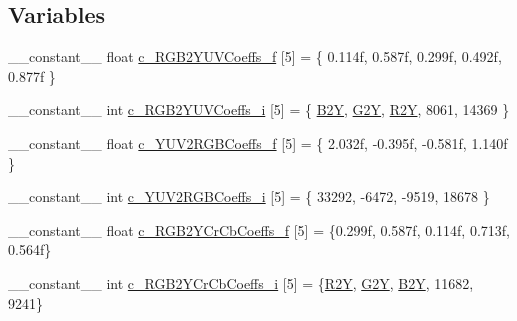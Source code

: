 \subsection*{Variables}
\begin{DoxyCompactItemize}
\item 
\-\_\-\-\_\-constant\-\_\-\-\_\- float \hyperlink{namespacecv_1_1gpu_1_1device_1_1color__detail_a7ba0f4d26dc8d4cdf0ea7045eea9a7f6}{c\-\_\-\-R\-G\-B2\-Y\-U\-V\-Coeffs\-\_\-f} \mbox{[}5\mbox{]} = \{ 0.\-114f, 0.\-587f, 0.\-299f, 0.\-492f, 0.\-877f \}
\item 
\-\_\-\-\_\-constant\-\_\-\-\_\- int \hyperlink{namespacecv_1_1gpu_1_1device_1_1color__detail_a706522af96fd781d4288448f001d3c6a}{c\-\_\-\-R\-G\-B2\-Y\-U\-V\-Coeffs\-\_\-i} \mbox{[}5\mbox{]} = \{ \hyperlink{namespacecv_1_1gpu_1_1device_1_1color__detail_ae58c078ca311bfd585ee671e5be8ae7ea012d3fbd135db816dc4aa715157d30e9}{B2\-Y}, \hyperlink{namespacecv_1_1gpu_1_1device_1_1color__detail_ae58c078ca311bfd585ee671e5be8ae7eaa29ed213682a1a97cc5fcc96decf0ad7}{G2\-Y}, \hyperlink{namespacecv_1_1gpu_1_1device_1_1color__detail_ae58c078ca311bfd585ee671e5be8ae7ead9cfd5ce6f8a65d50a1009d31ec5b27f}{R2\-Y}, 8061, 14369 \}
\item 
\-\_\-\-\_\-constant\-\_\-\-\_\- float \hyperlink{namespacecv_1_1gpu_1_1device_1_1color__detail_aaf1f69ee36d3549b97afb7bbd3cd4346}{c\-\_\-\-Y\-U\-V2\-R\-G\-B\-Coeffs\-\_\-f} \mbox{[}5\mbox{]} = \{ 2.\-032f, -\/0.\-395f, -\/0.\-581f, 1.\-140f \}
\item 
\-\_\-\-\_\-constant\-\_\-\-\_\- int \hyperlink{namespacecv_1_1gpu_1_1device_1_1color__detail_a6fc1bc14a4a8c737b6aeca6da9bf8497}{c\-\_\-\-Y\-U\-V2\-R\-G\-B\-Coeffs\-\_\-i} \mbox{[}5\mbox{]} = \{ 33292, -\/6472, -\/9519, 18678 \}
\item 
\-\_\-\-\_\-constant\-\_\-\-\_\- float \hyperlink{namespacecv_1_1gpu_1_1device_1_1color__detail_adaa4dd39f9935092666b86359548bd36}{c\-\_\-\-R\-G\-B2\-Y\-Cr\-Cb\-Coeffs\-\_\-f} \mbox{[}5\mbox{]} = \{0.\-299f, 0.\-587f, 0.\-114f, 0.\-713f, 0.\-564f\}
\item 
\-\_\-\-\_\-constant\-\_\-\-\_\- int \hyperlink{namespacecv_1_1gpu_1_1device_1_1color__detail_a1b845e7ebd625deef2552cc523b95496}{c\-\_\-\-R\-G\-B2\-Y\-Cr\-Cb\-Coeffs\-\_\-i} \mbox{[}5\mbox{]} = \{\hyperlink{namespacecv_1_1gpu_1_1device_1_1color__detail_ae58c078ca311bfd585ee671e5be8ae7ead9cfd5ce6f8a65d50a1009d31ec5b27f}{R2\-Y}, \hyperlink{namespacecv_1_1gpu_1_1device_1_1color__detail_ae58c078ca311bfd585ee671e5be8ae7eaa29ed213682a1a97cc5fcc96decf0ad7}{G2\-Y}, \hyperlink{namespacecv_1_1gpu_1_1device_1_1color__detail_ae58c078ca311bfd585ee671e5be8ae7ea012d3fbd135db816dc4aa715157d30e9}{B2\-Y}, 11682, 9241\}

\end{DoxyCompactItemize}
